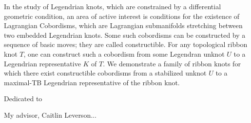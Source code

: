\documentclass[11pt,twoside,reqno]{book}
\begin{document}

\abstr


In the study of Legendrian knots, which are constrained by a differential geometric condition, an area of active interest is conditions for the existence of Lagrangian Cobordisms, which are Lagrangian submanifolds stretching between two embedded Legendrian knots.
Some such cobordisms can be constructed by a sequence of basic moves; they are called constructible.
For any topological ribbon knot $T$, one can construct such a cobordism from some Legendran unknot $U$ to a Legendrian representative $K$ of $T$.
We demonstrate a family of ribbon knots for which there exist constructible cobordisms from a stabilized unknot $U$ to a maximal-TB Legendrian representative of the ribbon knot.

\dedic

Dedicated to

\acknowl

My advisor, Caitlin Leverson...

\tableofcontents

\startmain







\begin{appendices}
    
\end{appendices}

\printbibliography[heading=bibintoc]
\end{document}
